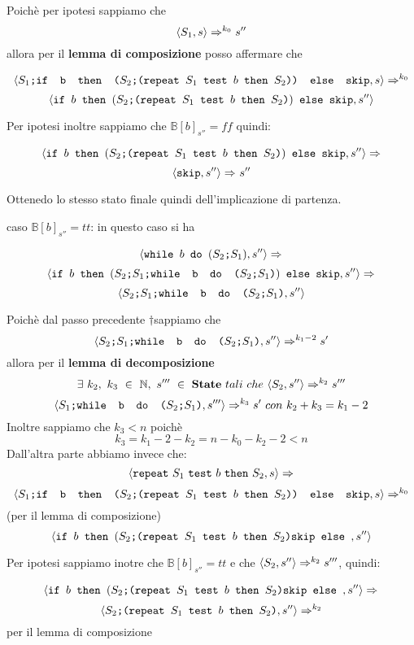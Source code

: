 {\begin{itemize}
		Poichè per ipotesi sappiamo che
		\[  \confSs{S_1}{s}\Rar{k_0}s'' \] allora
		per il \textbf{lemma di composizione} posso affermare che

		\[ \confSs{\concat{$S_1$}{\ifABC{b}{(\concat{$S_2$}
		{(\repeatSbS{$S_1$}{$b$}{$S_2$})})}{\skipistr}}}{s}\Rar{k_0} \]
		\[ \confSs{
			\ifABC{b}{(\concat{$S_2$}{(\repeatSbS{$S_1$}{$b$}{$S_2$})})} 
			{\skipistr}}{s''} \]

		Per ipotesi inoltre sappiamo che $\mathbb{B}[b]_{s''}=ff$ quindi:
	
	\[ 	\confSs{
			\ifABC{b}{(\concat{$S_2$}{(\repeatSbS{$S_1$}{$b$}{$S_2$})})} 
			{\skipistr}}{s''}\Rar{} \]
	\[ 	\confSs{\skipistr}{s''}\Rar{}s'' \]

		Ottenedo lo stesso stato finale quindi dell'implicazione di partenza.

		\subitem caso $\mathbb{B}[b]_{s''}=tt$: in questo caso si ha 

		\[ \confSs{\wbS{b}{(\concat{$S_2$}{$S_1$})}}{s''}\Rar{} \]
		\[ \confSs{\ifABC{b}{(\concat{\concat{$S_2$}{$S_1$}}
		{\wbS{b}{(\concat{$S_2$}{$S_1$})}})}{\skipistr}}{s''}\Rar{} \]
	\[ 	\confSs{\concat{\concat{$S_2$}{$S_1$}}
		{\wbS{b}{(\concat{$S_2$}{$S_1$})}}}{s''} \]

		Poichè dal passo precedente $\dagger $sappiamo che 
		\[ \confSs{\concat{\concat{$S_2$}{$S_1$}}
			{\wbS{b}{(\concat{$S_2$}{$S_1$})}}}{s''}\Rar{k_1 -2}s' \]
		allora
		per il \textbf{lemma di decomposizione} \\ 
	\[ 	\exists{}~k_2,~k_3~\in~
		\mathbb{N},~s'''~\in~\states{}~tali~che~\confSs{S_2}{s''}\Rar{k_2}s'''\]
		\[\confSs{\concat{$S_1$}{\wbS{b}{(\concat{$S_2$}{$S_1$})}}}{s'''}
		\Rar{k_3}s'~con~k_2+k_3=k_1-2 \]
		Inoltre sappiamo che $k_3<n$ poichè 
	\[ 	k_3=k_1-2-k_2=n-k_0-k_2-2<n \]
		Dall'altra parte abbiamo invece che:
		\[ \confSs{\repeatSbS{S_1}{b}{S_2}}{s}\Rar{} \]
	\[ 	\confSs{\concat{$S_1$}{\ifABC{b}{(\concat{$S_2$}
		{(\repeatSbS{$S_1$}{$b$}{$S_2$})})}{\skipistr}}}{s}\Rar{k_0} \] (per il
		lemma di composizione)\\
	\[ 	\confSs{\ifABC{b}{(\concat{$S_2$}
		{(\repeatSbS{$S_1$}{$b$}{$S_2$})}{\skipistr}}}{s''} \]

		Per ipotesi sappiamo inotre che $\mathbb{B}[b]_{s''}=tt$ e che 
		$\confSs{S_2}{s''}\Rar{k_2}s'''$, quindi:
	
\[ 		\confSs{\ifABC{b}{(\concat{$S_2$}
		{(\repeatSbS{$S_1$}{$b$}{$S_2$})}{\skipistr}}}{s''}\Rar{} \]
	\[ 	\confSs{\concat{$S_2$}{(\repeatSbS{$S_1$}{$b$}{$S_2$})}}{s''}\Rar{k_2} \] per il lemma di composizione 


\end{itemize}}
